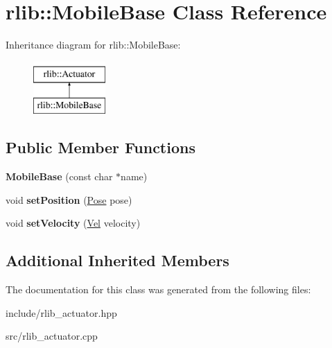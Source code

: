 \hypertarget{classrlib_1_1MobileBase}{\section{rlib\-:\-:Mobile\-Base Class Reference}
\label{classrlib_1_1MobileBase}
}
Inheritance diagram for rlib\-:\-:Mobile\-Base\-:\begin{figure}[H]
\begin{center}
\leavevmode
\includegraphics[height=2.000000cm]{classrlib_1_1MobileBase}
\end{center}
\end{figure}
\subsection*{Public Member Functions}
\begin{DoxyCompactItemize}
\item 
\hypertarget{classrlib_1_1MobileBase_a7bd9b6898b967ea5eee27f64a4a62063}{{\bfseries Mobile\-Base} (const char $\ast$name)}\label{classrlib_1_1MobileBase_a7bd9b6898b967ea5eee27f64a4a62063}

\item 
\hypertarget{classrlib_1_1MobileBase_ab384dfccdcadfdfdcb4682b7361502f0}{void {\bfseries set\-Position} (\hyperlink{classrlib_1_1Pose}{Pose} pose)}\label{classrlib_1_1MobileBase_ab384dfccdcadfdfdcb4682b7361502f0}

\item 
\hypertarget{classrlib_1_1MobileBase_a0d299cb807df63bd9cf9b259d4ce84fe}{void {\bfseries set\-Velocity} (\hyperlink{classrlib_1_1Vel}{Vel} velocity)}\label{classrlib_1_1MobileBase_a0d299cb807df63bd9cf9b259d4ce84fe}

\end{DoxyCompactItemize}
\subsection*{Additional Inherited Members}


The documentation for this class was generated from the following files\-:\begin{DoxyCompactItemize}
\item 
include/rlib\-\_\-actuator.\-hpp\item 
src/rlib\-\_\-actuator.\-cpp\end{DoxyCompactItemize}
